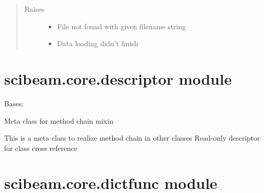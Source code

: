 \documentclass[letterpaper,10pt,english]{sphinxmanual}
\begin{document}
\begin{fulllineitems}
\begin{quote}
\begin{description}
\item[{Raises}] \leavevmode\begin{itemize}
\item {} 
 \textendash{} File not found with given filename string

\item {} 
 \textendash{} Data loading didn’t finish

\end{itemize}

\end{description}\end{quote}

\end{fulllineitems}



\section{scibeam.core.descriptor module}
\label{\detokenize{scibeam.core:module-scibeam.core.descriptor}}\label{\detokenize{scibeam.core:scibeam-core-descriptor-module}}

\begin{fulllineitems}
\label{\detokenize{scibeam.core:scibeam.core.descriptor.DescriptorMixin}}
Bases: 

Meta class for method chain mixin

This is a meta class to realize method chain in other classes
Read-only descriptor for class cross reference

\end{fulllineitems}



\section{scibeam.core.dictfunc module}
\label{\detokenize{scibeam.core:module-scibeam.core.dictfunc}}\label{\detokenize{scibeam.core:scibeam-core-dictfunc-module}}
\end{document}
